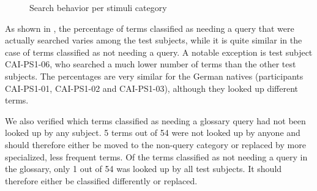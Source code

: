 \documentclass[output=paper]{langsci/langscibook}
\begin{document}
\begin{figure}
\caption{Search behavior per stimuli category\label{fig:prandi:9}}
\end{figure}

As shown in , the percentage of terms classified as needing a query that were actually searched varies among the test subjects, while it is quite similar in the case of terms classified as not needing a query. A notable exception is test subject \textsc{CAI}-PS1-06, who searched a much lower number of terms than the other test subjects. The percentages are very similar for the German natives (participants \textsc{CAI}-PS1-01, \textsc{CAI}-PS1-02 and \textsc{CAI}-PS1-03), although they looked up different terms.

We also verified which terms classified as needing a glossary query had not been looked up by any subject. 5 terms out of 54 were not looked up by anyone and should therefore either be moved to the non-query category or replaced by more specialized, less frequent terms. Of the terms classified as not needing a query in the glossary, only 1 out of 54 was looked up by all test subjects. It should therefore either be classified differently or replaced. 
\end{document}
